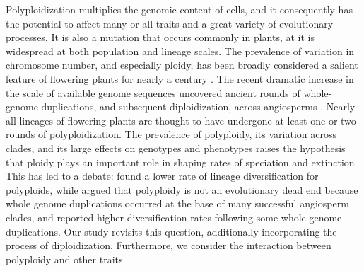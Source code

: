 Polyploidization multiplies the genomic content of cells, and it consequently has the potential to affect many or all traits and a great variety of evolutionary processes.
It is also a mutation that occurs commonly in plants, at it is widespread at both population and lineage scales.
The prevalence of variation in chromosome number, and especially ploidy, has been broadly considered a salient feature of flowering plants for nearly a century \citep{stebbins1938}. %
The recent dramatic increase in the scale of available genome sequences uncovered ancient rounds of whole-genome duplications, and subsequent diploidization, across angiosperms \citep{lynch2000, vision2000}.
Nearly all lineages of flowering plants are thought to have undergone at least one or two rounds of polyploidization. %
%
The prevalence of polyploidy, its variation across clades, and its large effects on genotypes and phenotypes raises the hypothesis that ploidy plays an important role in shaping rates of speciation and extinction.
This has led to a debate: \citet{mayrose_2011, mayrose_2015} found a lower rate of lineage diversification for polyploids, while \citet{soltis_2014} argued that polyploidy is not an evolutionary dead end because whole genome duplications occurred at the base of many successful angiosperm clades, and \citet{landis_2018} reported higher diversification rates following some whole genome duplications. %
Our study revisits this question, additionally incorporating the process of diploidization.
Furthermore, we consider the interaction between polyploidy and other traits.

